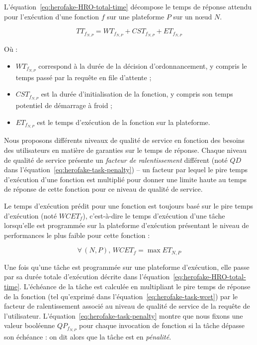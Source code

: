 L'équation~\ref{eq:herofake-HRO-total-time} décompose le temps de réponse attendu pour l'exécution d'une fonction $f$ sur une plateforme $P$ sur un nœud $N$.

\begin{equation}
    {TT}_{{f}_{N, P}} = {WT}_{{f}_{N, P}} + {CST}_{{f}_{N, P}} + {ET}_{{f}_{N, P}}
\label{eq:herofake-HRO-total-time}
\end{equation}

Où :

\begin{itemize}
    \item ${WT}_{{f}_{N, P}}$ correspond à la durée de la décision d'ordonnancement, y compris le temps passé par la requête en file d'attente ;
    \item ${CST}_{{f}_{N, P}}$ est la durée d'initialisation de la fonction, y compris son temps potentiel de démarrage à froid ;
    \item ${ET}_{{f}_{N, P}}$ est le temps d'exécution de la fonction sur la plateforme.
\end{itemize}

Nous proposons différents niveaux de qualité de service en fonction des besoins des utilisateurs en matière de garanties sur le temps de réponse. Chaque niveau de qualité de service présente un \textit{facteur de ralentissement} différent (noté $QD$ dans l'équation~\ref{eq:herofake-task-penalty}) -- un facteur par lequel le pire temps d'exécution d'une fonction est multiplié pour donner une limite haute au temps de réponse de cette fonction pour ce niveau de qualité de service.

Le temps d'exécution prédit pour une fonction est toujours basé sur le pire temps d'exécution (noté $WCET_{f}$), c'est-à-dire le temps d'exécution d'une tâche lorsqu'elle est programmée sur la plateforme d'exécution présentant le niveau de performances le plus faible pour cette fonction :

\begin{equation}
    \forall \, (N, P), \, WCET_{f} = \max ET_{N, P}
\label{eq:herofake-task-wcet}
\end{equation}

Une fois qu'une tâche est programmée sur une plateforme d'exécution, elle passe par sa durée totale d'exécution décrite dans l'équation~\ref{eq:herofake-HRO-total-time}. L'échéance de la tâche est calculée en multipliant le pire temps de réponse de la fonction (tel qu'exprimé dans l'équation~\ref{eq:herofake-task-wcet}) par le facteur de ralentissement associé au niveau de qualité de service de la requête de l'utilisateur. L'équation~\ref{eq:herofake-task-penalty} montre que nous fixons une valeur booléenne $QP_{f_{N, P}}$ pour chaque invocation de fonction si la tâche dépasse son échéance : on dit alors que la tâche est en \textit{pénalité}.

